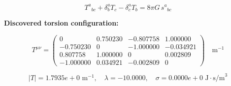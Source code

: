 
\begin{equation}
  T^a{}_{bc} + \delta^a_b T_c - \delta^a_c T_b = 8\pi G \, s^a{}_{bc}
\end{equation}

\textbf{Discovered torsion configuration:}

\begin{equation}
  T^{\mu\nu} = \begin{pmatrix}
    0 & 0.750230 & -0.807758 & 1.000000 \\
    -0.750230 & 0 & -1.000000 & -0.034921 \\
    0.807758 & 1.000000 & 0 & 0.002809 \\
    -1.000000 & 0.034921 & -0.002809 & 0
  \end{pmatrix} \quad \text{m}^{-1}
\end{equation}

\begin{equation}
  |T| = 1.7935e+0 \text{ m}^{-1}, \quad
  \lambda = -10.0000, \quad
  \sigma = 0.0000e+0 \text{ J}\cdot\text{s/m}^3
\end{equation}